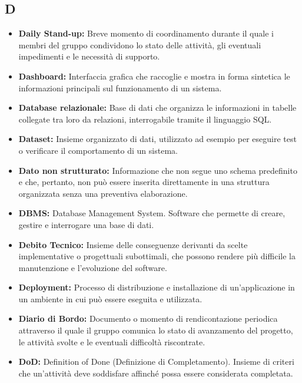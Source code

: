 
{}
\subsection*{D}

\begin{itemize}
    \item \textbf{Daily Stand-up:} Breve momento di coordinamento durante il quale i membri del gruppo condividono lo stato delle attività, gli eventuali impedimenti e le necessità di supporto.
    \item \textbf{Dashboard:} Interfaccia grafica che raccoglie e mostra in forma sintetica le informazioni principali sul funzionamento di un sistema.
    \item \textbf{Database relazionale:} Base di dati che organizza le informazioni in tabelle collegate tra loro da relazioni, interrogabile tramite il linguaggio SQL.
    \item \textbf{Dataset:} Insieme organizzato di dati, utilizzato ad esempio per eseguire test o verificare il comportamento di un sistema.
    \item \textbf{Dato non strutturato:} Informazione che non segue uno schema predefinito e che, pertanto, non può essere inserita direttamente in una struttura organizzata senza una preventiva elaborazione.
    \item \textbf{DBMS:} Database Management System. Software che permette di creare, gestire e interrogare una base di dati.
    \item \textbf{Debito Tecnico:} Insieme delle conseguenze derivanti da scelte implementative o progettuali subottimali, che possono rendere più difficile la manutenzione e l'evoluzione del software.
    \item \textbf{Deployment:} Processo di distribuzione e installazione di un'applicazione in un ambiente in cui può essere eseguita e utilizzata.
    \item \textbf{Diario di Bordo:} Documento o momento di rendicontazione periodica attraverso il quale il gruppo comunica lo stato di avanzamento del progetto, le attività svolte e le eventuali difficoltà riscontrate.
    \item \textbf{DoD:} Definition of Done (Definizione di Completamento). Insieme di criteri che un'attività deve soddisfare affinché possa essere considerata completata.
\end{itemize}

